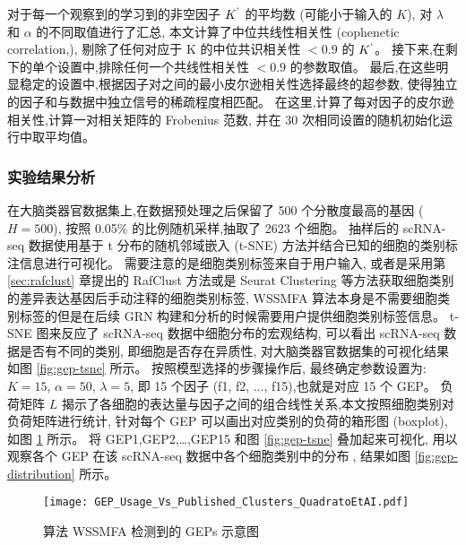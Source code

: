 对于每一个观察到的学习到的非空因子 $K^\textup{'}$ 的平均数 (可能小于输入的 $K$),
对 $\lambda$ 和 $\alpha$ 的不同取值进行了汇总,
本文计算了中位共线性相关性 (cophenetic correlation,),
剔除了任何对应于 K 的中位共识相关性 $< 0.9$ 的 $K^\textup{'}$。
接下来,在剩下的单个设置中,排除任何一个共线性相关性 $< 0.9$ 的参数取值。
最后,在这些明显稳定的设置中,根据因子对之间的最小皮尔逊相关性选择最终的超参数,
使得独立的因子和与数据中独立信号的稀疏程度相匹配。
在这里,计算了每对因子的皮尔逊相关性,计算一对相关矩阵的 Frobenius 范数, 
并在 30 次相同设置的随机初始化运行中取平均值。

\subsubsection{实验结果分析}

在大脑类器官数据集上,在数据预处理之后保留了 500 个分散度最高的基因 ($H = 500$),
按照 0.05\% 的比例随机采样,抽取了 2623 个细胞。
抽样后的 scRNA-seq 数据使用基于 t 分布的随机邻域嵌入 (t-SNE) 方法并结合已知的细胞的类别标注信息进行可视化。
需要注意的是细胞类别标签来自于用户输入,
或者是采用第 \ref{sec:rafclust} 章提出的 RafClust 方法或是 Seurat Clustering 等方法获取细胞类别的差异表达基因后手动注释的细胞类别标签, 
WSSMFA 算法本身是不需要细胞类别标签的但是在后续 GRN 构建和分析的时候需要用户提供细胞类别标签信息。
t-SNE 图来反应了 scRNA-seq 数据中细胞分布的宏观结构,
可以看出 scRNA-seq 数据是否有不同的类别,
即细胞是否存在异质性,
对大脑类器官数据集的可视化结果如图 \ref{fig:gep-tsne} 所示。
按照模型选择的步骤操作后,
最终确定参数设置为: $K = 15$, $\alpha = 50$, $\lambda = 5$, 
即 15 个因子 (f1, f2, $\ldots$, f15),也就是对应 15 个 GEP。
负荷矩阵 $L$ 揭示了各细胞的表达量与因子之间的组合线性关系,本文按照细胞类别对负荷矩阵进行统计,
针对每个 GEP 可以画出对应类别的负荷的箱形图 (boxplot),如图 \ref{fig:gep-gep} 所示。
将 GEP1,GEP2,\ldots,GEP15 和图 \ref{fig:gep-tsne} 叠加起来可视化,
用以观察各个 GEP 在该 scRNA-seq 数据中各个细胞类别中的分布,
结果如图 \ref{fig:gep-distribution} 所示。

\begin{figure}[!htbp]
    \centering
    \texttt{[image: GEP\_Usage\_Vs\_Published\_Clusters\_QuadratoEtAI.pdf]}
    \caption{
    算法 WSSMFA 检测到的 GEPs 示意图
    }
    \label{fig:gep-gep}
\end{figure}


